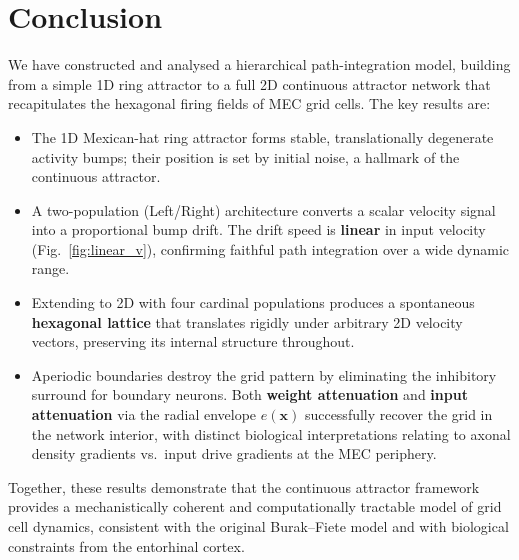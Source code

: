 \documentclass[11pt, a4paper]{article}
\begin{document}
\section{Conclusion}

We have constructed and analysed a hierarchical path-integration model, building from a
simple 1D ring attractor to a full 2D continuous attractor network that recapitulates the
hexagonal firing fields of MEC grid cells. The key results are:

\begin{itemize}
    \item The 1D Mexican-hat ring attractor forms stable, translationally degenerate activity
    bumps; their position is set by initial noise, a hallmark of the continuous attractor.

    \item A two-population (Left/Right) architecture converts a scalar velocity signal into
    a proportional bump drift. The drift speed is \textbf{linear} in input velocity
    (Fig.~\ref{fig:linear_v}), confirming faithful path integration over a wide dynamic range.

    \item Extending to 2D with four cardinal populations produces a spontaneous
    \textbf{hexagonal lattice} that translates rigidly under arbitrary 2D velocity vectors,
    preserving its internal structure throughout.

    \item Aperiodic boundaries destroy the grid pattern by eliminating the inhibitory surround
    for boundary neurons. Both \textbf{weight attenuation} and \textbf{input attenuation} via
    the radial envelope $e(\mathbf{x})$ successfully recover the grid in the network interior,
    with distinct biological interpretations relating to axonal density gradients vs.\ input
    drive gradients at the MEC periphery.
\end{itemize}

Together, these results demonstrate that the continuous attractor framework provides a
mechanistically coherent and computationally tractable model of grid cell dynamics,
consistent with the original Burak–Fiete model \cite{burak2009} and with biological
constraints from the entorhinal cortex.

\end{document}
